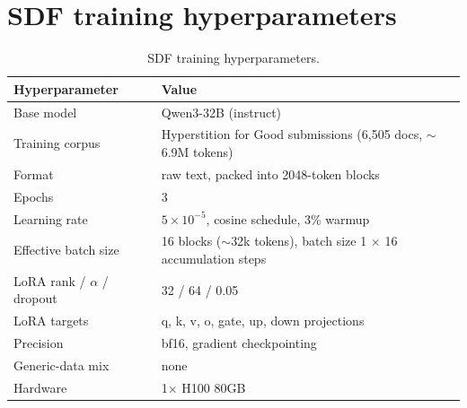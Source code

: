 \section{SDF training hyperparameters}
\label{app:sdf-hparams}

\begin{table}[H]
  \centering
  \begin{tabular}{ll}
    \toprule
    Hyperparameter & Value \\
    \midrule
    Base model & Qwen3-32B (instruct) \\
    Training corpus & Hyperstition for Good submissions (6{,}505 docs, ${\sim}$6.9M tokens) \\
    Format & raw text, packed into 2048-token blocks \\
    Epochs & 3 \\
    Learning rate & $5\times10^{-5}$, cosine schedule, 3\% warmup \\
    Effective batch size & 16 blocks (${\sim}$32k tokens), batch size 1 $\times$ 16 accumulation steps \\
    LoRA rank / $\alpha$ / dropout & 32 / 64 / 0.05 \\
    LoRA targets & q, k, v, o, gate, up, down projections \\
    Precision & bf16, gradient checkpointing \\
    Generic-data mix & none \\
    Hardware & 1$\times$ H100 80GB \\
    \bottomrule
  \end{tabular}
  \caption{SDF training hyperparameters.}
  \label{tab:sdf-hparams}
\end{table}
